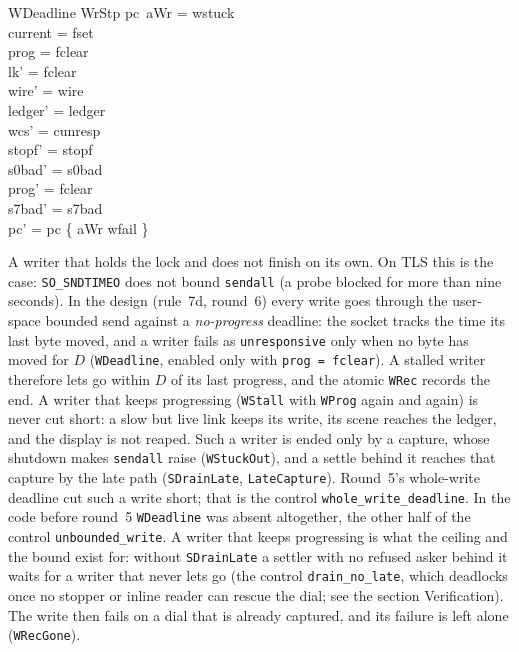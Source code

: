 \documentclass[a4paper,10pt,fleqn]{article}
\begin{document}
\begin{schema}{WDeadline}
  WrStp
\where
  pc~aWr = wstuck \\
  current = fset \\
  prog = fclear \\
  lk' = fclear \\
  wire' = wire \\
  ledger' = ledger \\
  wcs' = cunresp \\
  stopf' = stopf \\
  s0bad' = s0bad \\
  prog' = fclear \\
  s7bad' = s7bad \\
  pc' = pc \oplus \{ aWr \mapsto wfail \}
\end{schema}

A writer that holds the lock and does not finish on its own.  On TLS this is
the case: \texttt{SO\_SNDTIMEO} does not bound \texttt{sendall} (a probe blocked
for more than nine seconds).  In the design (rule~7d, round~6) every write goes
through the user-space bounded send against a \emph{no-progress} deadline: the
socket tracks the time its last byte moved, and a writer fails as
\texttt{unresponsive} only when no byte has moved for $D$ (\texttt{WDeadline},
enabled only with \texttt{prog = fclear}).  A stalled writer therefore lets go
within $D$ of its last progress, and the atomic \texttt{WRec} records the end.
A writer that keeps progressing (\texttt{WStall} with \texttt{WProg} again and
again) is never cut short: a slow but live link keeps its write, its scene
reaches the ledger, and the display is not reaped.  Such a writer is ended only
by a capture, whose shutdown makes \texttt{sendall} raise (\texttt{WStuckOut}),
and a settle behind it reaches that capture by the late path
(\texttt{SDrainLate}, \texttt{LateCapture}).  Round~5's whole-write deadline
cut such a write short; that is the control \texttt{whole\_write\_deadline}.  In
the code before round~5 \texttt{WDeadline} was absent altogether, the other half
of the control \texttt{unbounded\_write}.  A writer that keeps progressing is
what the ceiling and the bound exist for: without \texttt{SDrainLate} a settler with no refused asker behind it
waits for a writer that never lets go (the control \texttt{drain\_no\_late},
which deadlocks once no stopper or inline reader can rescue the dial; see the
section Verification).
The write then fails on a dial that is already captured, and its failure is
left alone (\texttt{WRecGone}).
\end{document}
